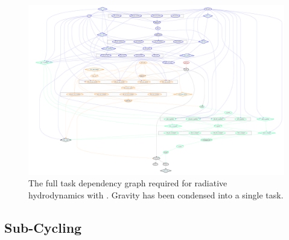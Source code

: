 \begin{figure}
 \centering
 \includegraphics[angle=90,height=.9\textheight]{figures/RHD/dependency_graph_nosubcycling.pdf}%
 \caption{
The full task dependency graph required for radiative hydrodynamics with \swift. Gravity has been
condensed into a single task.
 }
 \label{fig:RTtaskplot-nosubcycling}
\end{figure}






\subsection{Sub-Cycling}\label{chap:subcycling}



